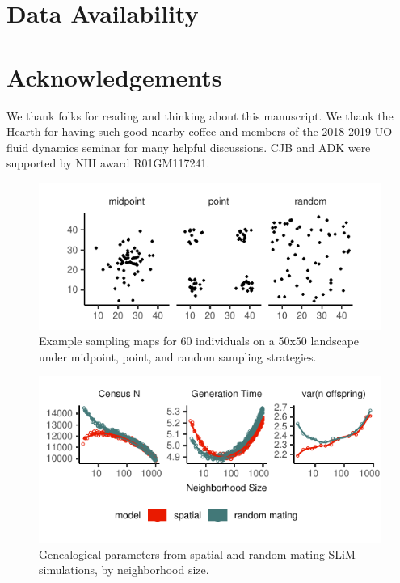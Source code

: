 \documentclass[10pt,twoside,lineno]{gsajnl}
\newif\ifcomments
\newcommand{\ak}[1]{\ifcomments{{\color{red} \it (#1)}}\else{}\fi}
\begin{document}
\ak{other things to say?}

\section{Data Availability}
\ak{github repo}

\section{Acknowledgements}
We thank folks for reading and thinking about this manuscript. We thank the Hearth for having such good nearby coffee and members of the 2018-2019 UO fluid dynamics seminar for many helpful discussions. CJB and ADK were supported by NIH award R01GM117241. 


\begin{figure}[htbp]
\includegraphics{figures/sampling_maps.pdf}
\caption{Example sampling maps for 60 individuals on a 50x50 landscape under midpoint, point, and random sampling strategies.}
\label{fig:samplemap}
\end{figure}

\begin{figure}[htbp]
\includegraphics{figures/pop_params.pdf}
\caption{Genealogical parameters from spatial and random mating SLiM simulations, by neighborhood size.}
\label{fig:genparams}
\end{figure}
\end{document}
